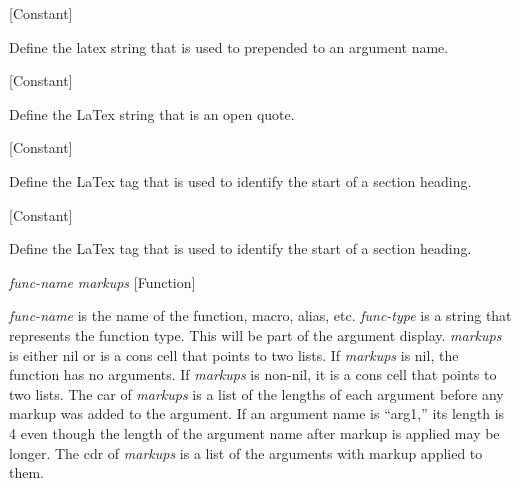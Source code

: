 \vspace{1em}
\noindent
{}
\usebox{\funcname}
 \hfill [Constant]

\begin{doc-string}
Define the latex string that is used to prepended to an argument name.
\end{doc-string}

\vspace{1em}
\noindent
{}
\usebox{\funcname}
 \hfill [Constant]

\begin{doc-string}
Define the LaTex string that is an open quote.
\end{doc-string}

\vspace{1em}
\noindent
{}
\usebox{\funcname}
 \hfill [Constant]

\begin{doc-string}
Define the LaTex tag that is used to identify the start of a section heading.
\end{doc-string}

\vspace{1em}
\noindent
{}
\usebox{\funcname}
 \hfill [Constant]

\begin{doc-string}
Define the LaTex tag that is used to identify the start of a section heading.
\end{doc-string}

\vspace{1em}
\noindent
{}
\usebox{\funcname}\emph{func-name} \emph{markups}
 \hfill [Function]
\hspace*{\wd\funcname}

\begin{doc-string}
\emph{func-name} is the name of the function, macro, alias, etc.  \emph{func-type} is a
string that represents the function type.  This will be part of the argument
display.  \emph{markups} is either nil or is a cons cell that points to two lists.  If
\emph{markups} is nil, the function has no arguments.  If \emph{markups} is non-nil, it is a
cons cell that points to two lists.  The car of \emph{markups} is a list of the lengths
of each argument before any markup was added to the argument.  If an argument
name is ``arg1,'' its length is 4 even though the length of the argument name
after markup is applied may be longer.  The cdr of \emph{markups} is a list of the
arguments with markup applied to them.
\end{doc-string}

